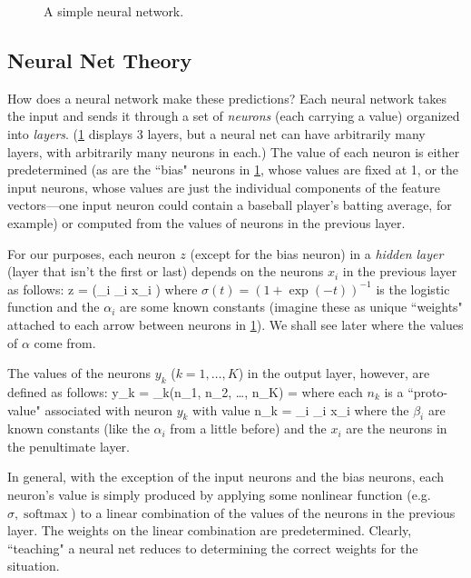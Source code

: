 \documentclass[10pt]{article}
\DeclareMathOperator{\softmax}{softmax}
\begin{document}
\begin{figure}[htbp]
\centering

\caption{A simple neural network.}
\label{fig:neuralnet}
\end{figure}


\subsection{Neural Net Theory}

How does a neural network make these predictions?
Each neural network takes the input and sends it through a set of \emph{neurons} (each carrying a value) organized into \emph{layers}.
(\cref{fig:neuralnet} displays 3 layers, but a neural net can have arbitrarily many layers, with arbitrarily many neurons in each.)
The value of each neuron is either predetermined (as are the ``bias" neurons in \cref{fig:neuralnet}, whose values are fixed at 1, or the input neurons, whose values are just the individual components of the feature vectors---one input neuron could contain a baseball player's batting average, for example) or computed from the values of neurons in the previous layer.

For our purposes, each neuron $z$ (except for the bias neuron) in a \emph{hidden layer} (layer that isn't the first or last) depends on the neurons $x_i$ in the previous layer as follows:
\beq
\label{eq:hiddenlayer}
z = \sigma\left(\sum_i \alpha_i x_i \right)
\eeq
where $\sigma(t) = (1 + \exp(-t))^{-1}$ is the logistic function and the $\alpha_i$ are some known constants (imagine these as unique ``weights" attached to each arrow between neurons in \cref{fig:neuralnet}). We shall see later where the values of $\alpha$ come from.

The values of the neurons $y_k$ ($k = 1, \dots, K$) in the output layer, however, are defined as follows:
\beq
y_k = \softmax_k(n_1, n_2, \dots, n_K) = 
\eeq
where each $n_k$ is a ``proto-value" associated with neuron $y_k$ with value
\beq
\label{eq:netvalue}
n_k = \sum_i \beta_i x_i
\eeq
where the $\beta_i$ are known constants (like the $\alpha_i$ from a little before) and the $x_i$ are the neurons in the penultimate layer.

In general, with the exception of the input neurons and the bias neurons, each neuron's value is simply produced by applying some nonlinear function (e.g. $\sigma, \softmax$) to a linear combination of the values of the neurons in the previous layer. The weights on the linear combination are predetermined. Clearly, ``teaching" a neural net reduces to determining  the correct weights for the situation.
\end{document}
